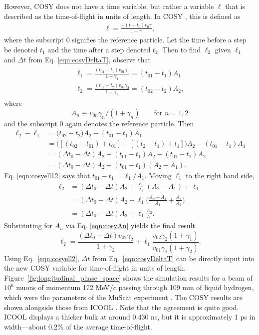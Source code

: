 However, COSY does not have a time variable, but rather a variable $\ell$ that is described as the time-of-flight in units of length. In COSY \cite{cosy}, this is defined as
\begin{align*}
\ell=\frac{-(t-t_0)v_0\gamma}{1+\gamma},
\end{align*}
where the subscript $0$ signifies the reference particle. Let the time before a step be denoted $t_1$ and the time after a step denoted $t_2$. Then to find $\ell_2$ given $\ell_1$ and $\Delta t$ from Eq. \eqref{eqn:cosyDeltaT}, observe that
\begin{align} \label{eqn:cosyell12}
\begin{split}
\ell_1=\frac{(t_{01}-t_1)v_{01}\gamma_1}{1+\gamma_1} = (t_{01}-t_1)A_1\\
\ell_2=\frac{(t_{02}-t_2)v_{02}\gamma_2}{1+\gamma_2} = (t_{02}-t_2)A_2,
\end{split}
\end{align}
where 
\begin{equation}\label{eqn:cosyAn}
A_n \equiv v_{0n}\gamma_n / (1+\gamma_n) \qquad \text{for }n=1,2
\end{equation}
and the subscript $0$ again denotes the reference particle.
Then
\begin{align*}
\ell_2 - \ell_1 &=\big(t_{02}-t_2\big)A_2-(t_{01}-t_1)A_1\\
&=\big([(t_{02}-t_{01})+t_{01}]-[(t_2-t_1)+t_1]\big)A_2-(t_{01}-t_1)A_1\\
&=(\Delta t_0 - \Delta t )A_2 + (t_{01}-t_1)A_2-(t_{01}-t_1)A_2\\
&=(\Delta t_0 - \Delta t )A_2 + (t_{01}-t_1)(A_2-A_1).
\end{align*}
Eq. \eqref{eqn:cosyell12} says that $t_{01}-t_1=\ell_1/A_1$. Moving $\ell_1$ to the right hand side,
\begin{align*}
\ell_2 &= (\Delta t_0 - \Delta t)A_2 + \frac{\ell_1}{A_1}(A_2-A_1)+\ell_1\\
&=(\Delta t_0 - \Delta t)A_2 + \ell_1\Big(\frac{A_2-A_1}{A_1}+\frac{A_1}{A_1}\Big)\\
&=(\Delta t_0 - \Delta t)A_2 + \ell_1\frac{A_2}{A_1}.
\end{align*}
Substituting for $A_n$ via Eq. \eqref{eqn:cosyAn} yields the final result
\begin{equation}\label{eqn:cosyell2}
\ell_2=\frac{(\Delta t_0 - \Delta t) v_{02}\gamma_2}{1+\gamma_2}+\ell_1 \frac{v_{02}\gamma_2 (1+\gamma_1)}{v_{01}\gamma_1 (1+\gamma_2)}.
\end{equation}
Using Eq.~\eqref{eqn:cosyell2}, $\Delta t$ from Eq.~\eqref{eqn:cosyDeltaT} can be directly input into the new COSY variable for time-of-flight in units of length. Figure~\ref{fig:longitudinal_phase_space} shows the simulation results for a beam of $10^6$ muons of momentum 172 MeV/$c$ passing through 109 mm of liquid hydrogen, which were the parameters of the MuScat experiment \cite{muscat}. The COSY results are shown alongside those from ICOOL \cite{icool}. Note that the agreement is quite good. ICOOL displays a thicker bulk at around 0.430 ns, but it is approximately 1 ps in width---about 0.2\% of the average time-of-flight.

